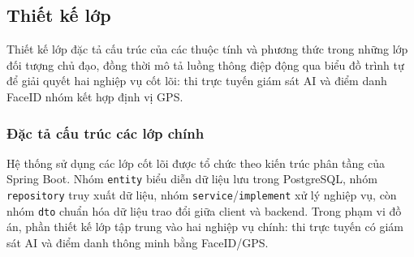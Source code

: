 \documentclass[../DoAn.tex]{subfiles}
\begin{document}
\subsection{Thiết kế lớp}
Thiết kế lớp đặc tả cấu trúc của các thuộc tính và phương thức trong những lớp đối tượng chủ đạo, đồng thời mô tả luồng thông điệp động qua biểu đồ trình tự để giải quyết hai nghiệp vụ cốt lõi: thi trực tuyến giám sát AI và điểm danh FaceID nhóm kết hợp định vị GPS.

\subsubsection{Đặc tả cấu trúc các lớp chính}
Hệ thống sử dụng các lớp cốt lõi được tổ chức theo kiến trúc phân tầng của Spring Boot. Nhóm \texttt{entity} biểu diễn dữ liệu lưu trong PostgreSQL, nhóm \texttt{repository} truy xuất dữ liệu, nhóm \texttt{service}/\texttt{implement} xử lý nghiệp vụ, còn nhóm \texttt{dto} chuẩn hóa dữ liệu trao đổi giữa client và backend. Trong phạm vi đồ án, phần thiết kế lớp tập trung vào hai nghiệp vụ chính: thi trực tuyến có giám sát AI và điểm danh thông minh bằng FaceID/GPS.
\end{document}
